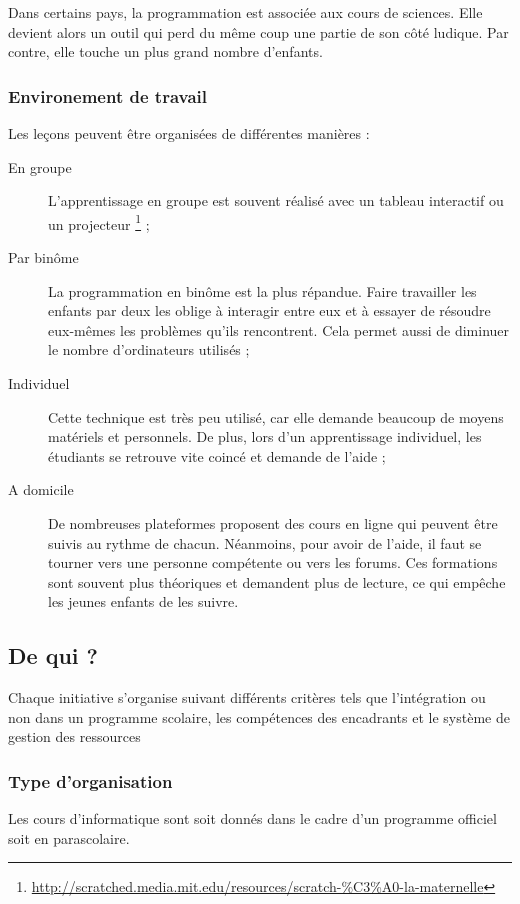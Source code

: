 Dans certains pays, la programmation est associée aux cours de sciences. Elle devient alors un outil qui perd du même coup une partie de son côté ludique. Par contre, elle touche un plus grand nombre d'enfants.\\

\subsubsection{Environement de travail}
\label{paire}
Les leçons peuvent être organisées de différentes manières :
\begin{description}
  \item[En groupe] L'apprentissage en groupe est souvent réalisé avec un tableau interactif ou un projecteur \footnote{\url{http://scratched.media.mit.edu/resources/scratch-\%C3\%A0-la-maternelle}} ;
  \item[Par binôme] La programmation en binôme est la plus répandue. Faire travailler les enfants par deux les oblige à interagir entre eux et à essayer de résoudre eux-mêmes les problèmes qu'ils rencontrent. Cela permet aussi de diminuer le nombre d'ordinateurs utilisés ;
  \item[Individuel] Cette technique est très peu utilisé, car elle demande beaucoup de moyens matériels et personnels. De plus, lors d'un apprentissage individuel, les étudiants se retrouve vite coincé et demande de l'aide ;
  \item[A domicile] De nombreuses plateformes proposent des cours en ligne qui peuvent être suivis au rythme de chacun. Néanmoins, pour avoir de l'aide, il faut se tourner vers une personne compétente ou vers les forums. Ces formations sont souvent plus théoriques et demandent plus de lecture, ce qui empêche les jeunes enfants de les suivre.
\end{description}

\subsection{De qui ?}
Chaque initiative s'organise suivant différents critères tels que l'intégration ou non dans un programme scolaire, les compétences des encadrants et le système de gestion des ressources

\subsubsection{Type d'organisation}
Les cours d'informatique sont soit donnés dans le cadre d'un programme officiel soit en parascolaire.

